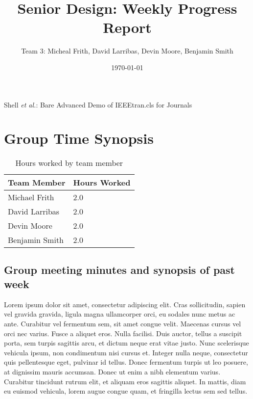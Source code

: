 \documentclass[12pt,journal,compsoc]{IEEEtran}
\begin{document}
\title{Senior Design: Weekly Progress Report}
\author{Team 3: Micheal Frith, David Larribas, Devin Moore, Benjamin Smith}
\date{\today}
\maketitle

%
{Shell \MakeLowercase{\textit{et al.}}: Bare Advanced Demo of IEEEtran.cls for Journals}

\section{Group Time Synopsis}
\begin{table}[ht]
\renewcommand{\arraystretch}{1.3}
	\caption{Hours worked by team member}
	
	\label{Team Hour Summary}
	
	\centering
	
	\begin{tabular}{p{4cm}|p{4cm}}

	\hline
	\bfseries 	Team Member 		& \bfseries Hours Worked\\
	\hline
	\hline
				Michael Frith		& 2.0					\\
				David Larribas 		& 2.0					\\	
				Devin Moore 		& 2.0					\\	
				Benjamin Smith		& 2.0					\\	
	\hline
	\end{tabular}
\end{table}
 
\subsection{Group meeting minutes and synopsis of past week}

Lorem ipsum dolor sit amet, consectetur adipiscing elit. Cras sollicitudin, sapien vel gravida gravida, ligula magna ullamcorper orci, eu sodales nunc metus ac ante. Curabitur vel fermentum sem, sit amet congue velit. Maecenas cursus vel orci nec varius. Fusce a aliquet eros. Nulla facilisi. Duis auctor, tellus a suscipit porta, sem turpis sagittis arcu, et dictum neque erat vitae justo. Nunc scelerisque vehicula ipsum, non condimentum nisi cursus et. Integer nulla neque, consectetur quis pellentesque eget, pulvinar id tellus. Donec fermentum turpis ut leo posuere, at dignissim mauris accumsan. Donec ut enim a nibh elementum varius. Curabitur tincidunt rutrum elit, et aliquam eros sagittis aliquet. In mattis, diam eu euismod vehicula, lorem augue congue quam, et fringilla lectus sem sed tellus.
\end{document}

